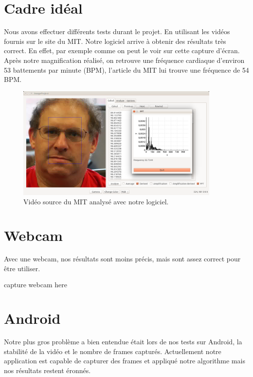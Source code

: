 \section{Cadre idéal}

Nous avons effectuer différents tests durant le projet. En utilisant les vidéos fournis sur le site du MIT. Notre logiciel arrive à obtenir des 
résultats très correct. En effet, par exemple comme on peut le voir sur cette capture d'écran. Après notre magnification réalisé, on retrouve
une fréquence cardiaque d'environ 53 battements par minute (BPM), l'article du MIT lui trouve une fréquence de 54 BPM.  

\begin{figure}[h!]
	\centering
	\includegraphics[width=0.9\textwidth]{data/cas-ideal.png}
	\caption{Vidéo source du MIT analysé avec notre logiciel.}
\end{figure}


\section{Webcam}

Avec une webcam, nos résultats sont moins précis, mais sont assez correct pour être utiliser. 

capture webcam here

\section{Android}

Notre plus gros problème a bien entendue était lors de nos tests sur Android, la stabilité de la vidéo et le nombre de frames capturés.
Actuellement notre application est capable de capturer des frames et appliqué notre algorithme mais nos résultats restent éronnés.
